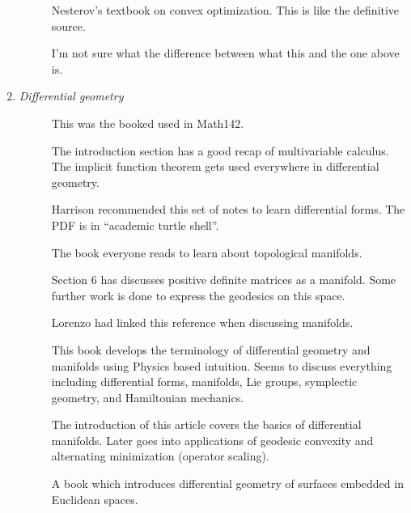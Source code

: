 \documentclass{article}
\theoremstyle{definition}
\begin{document}
\begin{enumerate}[--]
\begin{description}
\item[\cite{Nes13}] Nesterov's textbook on convex optimization. This is like the definitive source.

\item[\cite{Nes18}] I'm not sure what the difference between what this and the one above is.
\end{description}


\item \emph{Differential geometry}
\begin{description}
\item[\cite{Mil77}] This was the booked used in Math142.

\item[\cite{Tay11}] The introduction section has a good recap of multivariable calculus. The implicit function theorem gets used everywhere in differential geometry.

\item[\cite{Del16}] Harrison recommended this set of notes to learn differential forms. The PDF is in ``academic turtle shell''.

\item[\cite{Lee10}] The book everyone reads to learn about topological manifolds.

\item[\cite{Bha09}] Section 6 has discusses positive definite matrices as a manifold. Some further work is done to express the geodesics on this space.

\item[\cite{Lov19}] Lorenzo had linked this reference when discussing manifolds.

\item[\cite{RSS12}] This book develops the terminology of differential geometry and manifolds using Physics based intuition. Seems to discuss everything including differential forms, manifolds, Lie groups, symplectic geometry, and Hamiltonian mechanics.

\item[\cite{Vis18}] The introduction of this article covers the basics of differential manifolds. Later goes into applications of geodesic convexity and alternating minimization (operator scaling).

\item[\cite{BL16}] A book which introduces differential geometry of surfaces embedded in Euclidean spaces.
\end{description}


\end{enumerate}
\end{document}
